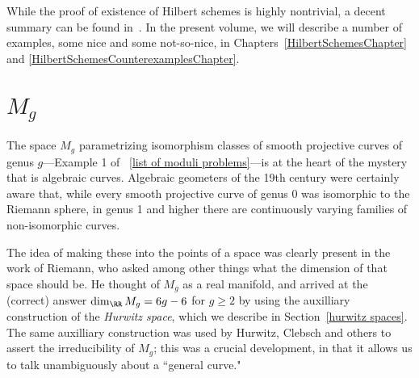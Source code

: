 While the proof of existence of Hilbert schemes is highly nontrivial, a decent summary can be found in~\cite{3264}. In the present volume, we will describe a number of examples,  some nice  and some not-so-nice, in Chapters~\ref{HilbertSchemesChapter} and \ref{HilbertSchemesCounterexamplesChapter}.

%


\section{$M_g$}

The space $M_g$ parametrizing isomorphism classes of smooth projective curves of genus $g$---Example 1 of ~\ref{list of moduli problems}---is at the heart of the mystery that is algebraic curves. 
Algebraic geometers of the 19th century were certainly aware that, while every smooth projective curve of genus 0 was isomorphic to the Riemann sphere, in  genus 1 and higher there are continuously varying families of non-isomorphic curves. 

The idea of
making these into the points of a space was clearly present in the work of Riemann, who asked among other things what the dimension of that space should be. He thought of $M_g$ as a real manifold, and arrived at the (correct) answer $\dim_\RR M_g = 6g-6$ for $g \geq 2$ by using the auxilliary construction of the \emph{Hurwitz space}, which we describe in Section~\ref{hurwitz spaces}. The same auxilliary construction was used by Hurwitz, Clebsch and others to assert the irreducibility of $M_g$; this was a crucial development, in that it allows us to talk unambiguously about a ``general curve."

